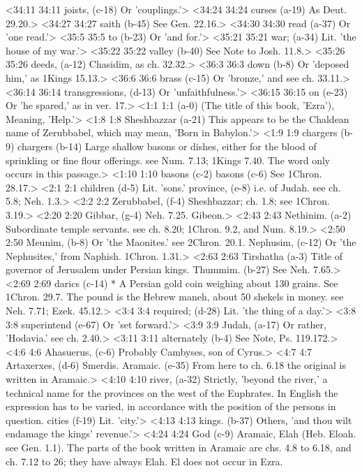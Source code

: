 <34:11 34:11  joists, (c-18)  Or 'couplings.'>
<34:24 34:24  curses (a-19)  As Deut. 29.20.>
<34:27 34:27  saith (b-45)  See Gen. 22.16.>
<34:30 34:30  read (a-37)  Or 'one read.'>
<35:5 35:5  to (b-23)  Or 'and for.'>
<35:21 35:21  war; (a-34)  Lit. 'the house of my war.'>
<35:22 35:22  valley (b-40)  See Note to Josh. 11.8.>
<35:26 35:26  deeds, (a-12)  Chasidim, as ch. 32.32.>
<36:3 36:3  down (b-8)  Or 'deposed him,' as 1Kings 15.13.>
<36:6 36:6  brass (c-15)  Or 'bronze,' and see ch. 33.11.>
<36:14 36:14  transgressions, (d-13)  Or 'unfaithfulness.'>
<36:15 36:15  on (e-23)  Or 'he spared,' as in ver. 17.>
<1:1 1:1   (a-0)  (The title of this book, 'Ezra'), Meaning, 'Help.'>
<1:8 1:8  Sheshbazzar (a-21)  This appears to be the Chaldean name of Zerubbabel, which may  mean, 'Born in Babylon.'>
<1:9 1:9  chargers (b-9)  chargers (b-14)
  Large shallow basons or dishes, either for the blood of  sprinkling or fine flour offerings. see Num. 7.13; 1Kings 7.40.  The word only occurs in this passage.>
<1:10 1:10  basons (c-2)  basons (c-6)
  See 1Chron. 28.17.>
<2:1 2:1  children (d-5)  Lit. 'sons.'
  province, (e-8)  i.e. of Judah. see ch. 5.8; Neh. 1.3.>
<2:2 2:2  Zerubbabel, (f-4)  Sheshbazzar; ch. 1.8; see 1Chron. 3.19.>
<2:20 2:20  Gibbar, (g-4)  Neh. 7.25. Gibeon.>
<2:43 2:43  Nethinim. (a-2)  Subordinate temple servants. see ch. 8.20; 1Chron. 9.2, and  Num. 8.19.>
<2:50 2:50  Meunim, (b-8)  Or 'the Maonites.' see 2Chron. 20.1.
  Nephusim, (c-12)  Or 'the Nephusites,' from Naphish. 1Chron. 1.31.>
<2:63 2:63  Tirshatha (a-3)  Title of governor of Jerusalem under Persian kings.
  Thummim. (b-27)  See Neh. 7.65.>
<2:69 2:69  darics (c-14)  * A Persian gold coin weighing about 130 grains. See 1Chron. 29.7. The pound is the Hebrew maneh, about 50 shekels in  money. see Neh. 7.71; Ezek. 45.12.>
<3:4 3:4  required; (d-28)  Lit. 'the thing of a day.'>
<3:8 3:8  superintend (e-67)  Or 'set forward.'>
<3:9 3:9  Judah, (a-17)  Or rather, 'Hodavia.' see ch. 2.40.>
<3:11 3:11  alternately (b-4)  See Note, Ps. 119.172.>
<4:6 4:6  Ahasuerus, (c-6)  Probably Cambyses, son of Cyrus.>
<4:7 4:7  Artaxerxes, (d-6)  Smerdis.
  Aramaic. (e-35)  From here to ch. 6.18 the original is written in Aramaic.>
<4:10 4:10  river, (a-32)  Strictly, 'beyond the river,' a technical name for the  provinces on the west of the Euphrates. In English the  expression has to be varied, in accordance with the position of  the persons in question.
  cities (f-19)  Lit. 'city.'>
<4:13 4:13  kings. (b-37)  Others, 'and thou wilt endamage the kings' revenue.'>
<4:24 4:24  God (c-9)  Aramaic, Elah (Heb. Eloah. see Gen. 1.1). The parts of  the book written in Aramaic are chs. 4.8 to 6.18, and ch. 7.12  to 26; they have always Elah. El does not occur in Ezra.
